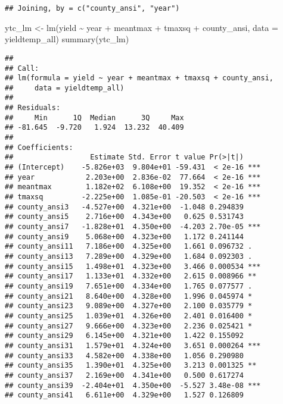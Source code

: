 \documentclass[
]{book}
\newenvironment{Shaded}{\begin{snugshade}}{\end{snugshade}}
\newcommand{\AttributeTok}[1]{\textcolor[rgb]{0.77,0.63,0.00}{#1}}
\newcommand{\FunctionTok}[1]{\textcolor[rgb]{0.00,0.00,0.00}{#1}}
\newcommand{\NormalTok}[1]{#1}
\newcommand{\OtherTok}[1]{\textcolor[rgb]{0.56,0.35,0.01}{#1}}
\newcommand{\SpecialCharTok}[1]{\textcolor[rgb]{0.00,0.00,0.00}{#1}}
\begin{document}
\begin{verbatim}
## Joining, by = c("county_ansi", "year")
\end{verbatim}

\begin{Shaded}
\begin{Highlighting}[]
\NormalTok{ytc\_lm }\OtherTok{\textless{}{-}} \FunctionTok{lm}\NormalTok{(yield }\SpecialCharTok{\textasciitilde{}}\NormalTok{ year }\SpecialCharTok{+}\NormalTok{ meantmax }\SpecialCharTok{+}\NormalTok{ tmaxsq }\SpecialCharTok{+}\NormalTok{ county\_ansi, }\AttributeTok{data =}\NormalTok{ yieldtemp\_all)}
\FunctionTok{summary}\NormalTok{(ytc\_lm)}
\end{Highlighting}
\end{Shaded}

\begin{verbatim}
## 
## Call:
## lm(formula = yield ~ year + meantmax + tmaxsq + county_ansi, 
##     data = yieldtemp_all)
## 
## Residuals:
##     Min      1Q  Median      3Q     Max 
## -81.645  -9.720   1.924  13.232  40.409 
## 
## Coefficients:
##                  Estimate Std. Error t value Pr(>|t|)    
## (Intercept)    -5.826e+03  9.804e+01 -59.431  < 2e-16 ***
## year            2.203e+00  2.836e-02  77.664  < 2e-16 ***
## meantmax        1.182e+02  6.108e+00  19.352  < 2e-16 ***
## tmaxsq         -2.225e+00  1.085e-01 -20.503  < 2e-16 ***
## county_ansi3   -4.527e+00  4.321e+00  -1.048 0.294839    
## county_ansi5    2.716e+00  4.343e+00   0.625 0.531743    
## county_ansi7   -1.828e+01  4.350e+00  -4.203 2.70e-05 ***
## county_ansi9    5.068e+00  4.323e+00   1.172 0.241144    
## county_ansi11   7.186e+00  4.325e+00   1.661 0.096732 .  
## county_ansi13   7.289e+00  4.329e+00   1.684 0.092303 .  
## county_ansi15   1.498e+01  4.323e+00   3.466 0.000534 ***
## county_ansi17   1.133e+01  4.332e+00   2.615 0.008966 ** 
## county_ansi19   7.651e+00  4.334e+00   1.765 0.077577 .  
## county_ansi21   8.640e+00  4.328e+00   1.996 0.045974 *  
## county_ansi23   9.089e+00  4.327e+00   2.100 0.035779 *  
## county_ansi25   1.039e+01  4.326e+00   2.401 0.016400 *  
## county_ansi27   9.666e+00  4.323e+00   2.236 0.025421 *  
## county_ansi29   6.145e+00  4.321e+00   1.422 0.155092    
## county_ansi31   1.579e+01  4.324e+00   3.651 0.000264 ***
## county_ansi33   4.582e+00  4.338e+00   1.056 0.290980    
## county_ansi35   1.390e+01  4.325e+00   3.213 0.001325 ** 
## county_ansi37   2.169e+00  4.341e+00   0.500 0.617274    
## county_ansi39  -2.404e+01  4.350e+00  -5.527 3.48e-08 ***
## county_ansi41   6.611e+00  4.329e+00   1.527 0.126809    

\end{verbatim}
\end{document}
